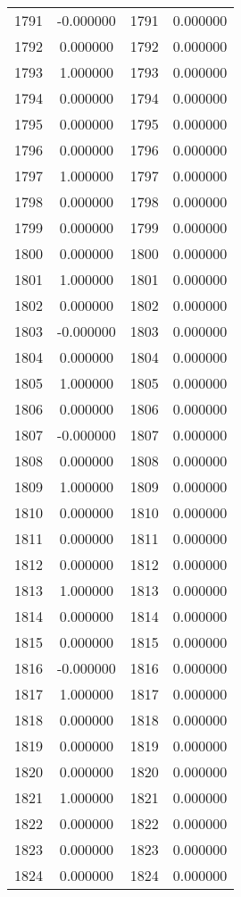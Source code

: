 \documentclass[12pt]{article}
\begin{document}
\begin{longtable}{@{}cccc@{}}
1791 & -0.000000 & 1791 & 0.000000 \\
1792 & 0.000000 & 1792 & 0.000000 \\
1793 & 1.000000 & 1793 & 0.000000 \\
1794 & 0.000000 & 1794 & 0.000000 \\
1795 & 0.000000 & 1795 & 0.000000 \\
1796 & 0.000000 & 1796 & 0.000000 \\
1797 & 1.000000 & 1797 & 0.000000 \\
1798 & 0.000000 & 1798 & 0.000000 \\
1799 & 0.000000 & 1799 & 0.000000 \\
1800 & 0.000000 & 1800 & 0.000000 \\
1801 & 1.000000 & 1801 & 0.000000 \\
1802 & 0.000000 & 1802 & 0.000000 \\
1803 & -0.000000 & 1803 & 0.000000 \\
1804 & 0.000000 & 1804 & 0.000000 \\
1805 & 1.000000 & 1805 & 0.000000 \\
1806 & 0.000000 & 1806 & 0.000000 \\
1807 & -0.000000 & 1807 & 0.000000 \\
1808 & 0.000000 & 1808 & 0.000000 \\
1809 & 1.000000 & 1809 & 0.000000 \\
1810 & 0.000000 & 1810 & 0.000000 \\
1811 & 0.000000 & 1811 & 0.000000 \\
1812 & 0.000000 & 1812 & 0.000000 \\
1813 & 1.000000 & 1813 & 0.000000 \\
1814 & 0.000000 & 1814 & 0.000000 \\
1815 & 0.000000 & 1815 & 0.000000 \\
1816 & -0.000000 & 1816 & 0.000000 \\
1817 & 1.000000 & 1817 & 0.000000 \\
1818 & 0.000000 & 1818 & 0.000000 \\
1819 & 0.000000 & 1819 & 0.000000 \\
1820 & 0.000000 & 1820 & 0.000000 \\
1821 & 1.000000 & 1821 & 0.000000 \\
1822 & 0.000000 & 1822 & 0.000000 \\
1823 & 0.000000 & 1823 & 0.000000 \\
1824 & 0.000000 & 1824 & 0.000000 \\

\end{longtable}
\end{document}
